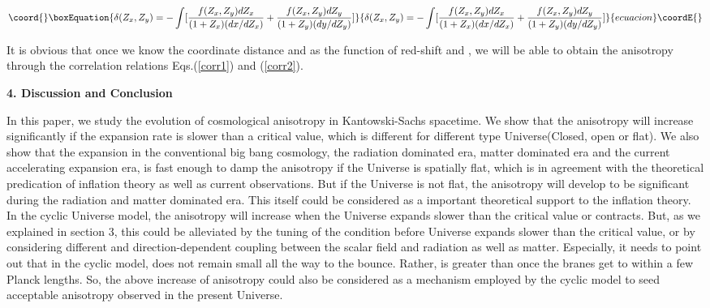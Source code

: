 \documentclass[a4paper,preprint]{revtex4}
\begin{document}
\begin{equation}\coord{}\boxEquation{\label{corr2}
\delta(Z_x, Z_y)=-\int[\frac{f(Z_x,
Z_y)dZ_x}{(1+Z_x)(dx/dZ_x)}+\frac{f(Z_x,
Z_y)dZ_y}{(1+Z_y)(dy/dZ_y)}]
}{\delta(Z_x, Z_y)=-\int[\frac{f(Z_x,
Z_y)dZ_x}{(1+Z_x)(dx/dZ_x)}+\frac{f(Z_x,
Z_y)dZ_y}{(1+Z_y)(dy/dZ_y)}]
}{ecuacion}\coordE{}\end{equation}

It is obvious that once we know the coordinate distance \coordHE{} and
\coordHE{} as the function of red-shift \coordHE{} and \coordHE{}, we will be able
to obtain the anisotropy \myHighlight{$\delta$}\coordHE{} through the correlation
relations Eqs.(\ref{corr1}) and (\ref{corr2}).

\vspace{0.4cm} \noindent\textbf{4. Discussion and Conclusion}
 \vspace{0.4cm}

In this paper, we study the evolution of cosmological anisotropy
in Kantowski-Sachs spacetime. We show that the anisotropy will
increase significantly if the expansion rate is slower than a
critical value, which is different for different type
Universe(Closed, open or flat). We also show that the expansion in
the conventional big bang cosmology, the radiation dominated era,
matter dominated era and the current accelerating expansion era,
is fast enough to damp the anisotropy if the Universe is spatially
flat, which is in agreement with the theoretical predication of
inflation theory as well as current observations. But if the
Universe is not flat, the anisotropy will develop to be
significant during the radiation and matter dominated era. This
itself could be considered as a important theoretical support to
the inflation theory. In the cyclic Universe model, the anisotropy
will increase when the Universe expands slower than the critical
value or contracts. But, as we explained in section 3, this could
be alleviated by the tuning of the condition before Universe
expands slower than the critical value, or by considering
different and direction-dependent coupling between the scalar
field and radiation as well as matter. Especially, it needs to
point out that in the cyclic model, \coordHE{} does not remain small all
the way to the bounce. Rather, \coordHE{} is greater than \coordHE{}
once the branes get to within a few Planck
lengths\cite{steinhardt3}. So, the above increase of anisotropy
could also be considered as a mechanism employed by the cyclic
model to seed acceptable anisotropy observed in the present
Universe.
\end{document}
